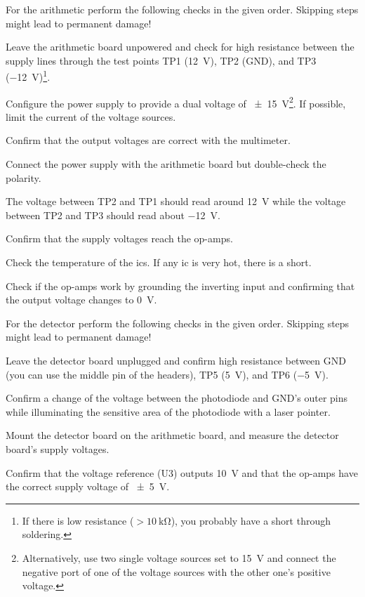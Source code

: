 For the arithmetic perform the following checks in the given order.
Skipping steps might lead to permanent damage!
\begin{todolist}
	\item Leave the arithmetic board unpowered and check for high resistance between the supply lines through the test points TP1 (\SI{+12}{\volt}), TP2 (GND), and TP3 (\SI{-12}{\volt})\footnote{If there is low resistance ($>\SI{10}{\kilo\ohm}$), you probably have a short through soldering.}.
	\item Configure the power supply to provide a dual voltage of \SI{\pm15}{\volt}\footnote{Alternatively, use two single voltage sources set to \SI{15}{\volt} and connect the negative port of one of the voltage sources with the other one's positive voltage.}. If possible, limit the current of the voltage sources.
	\item Confirm that the output voltages are correct with the multimeter.
	\item Connect the power supply with the arithmetic board but double-check the polarity.
	\item The voltage between TP2 and TP1 should read around \SI{+12}{\volt} while the voltage between TP2 and TP3 should read about \SI{-12}{\volt}.
	\item Confirm that the supply voltages reach the op-amps.
	\item Check the temperature of the \gls{ic}s. If any \gls{ic} is very hot, there is a short.
	\item Check if the op-amps work by grounding the inverting input and confirming that the output voltage changes to \SI{0}{\volt}.
\end{todolist}

For the detector perform the following checks in the given order.
Skipping steps might lead to permanent damage!
\begin{todolist}
	\item Leave the detector board unplugged and confirm high resistance between GND (you can use the middle pin of the headers), TP5 (\SI{+5}{\volt}), and TP6 (\SI{-5}{\volt}).
	\item Confirm a change of the voltage between the photodiode and GND's outer pins while illuminating the sensitive area of the photodiode with a laser pointer.
	\item Mount the detector board on the arithmetic board, and measure the detector board's supply voltages.
	\item Confirm that the voltage reference (U3) outputs \SI{10}{\volt} and that the op-amps have the correct supply voltage of \SI{\pm5}{\volt}.
\end{todolist}

